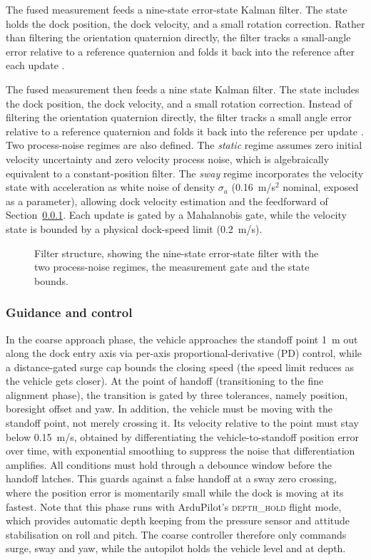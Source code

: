 The fused measurement feeds a nine-state error-state Kalman filter. The state holds the dock position, the dock velocity, and a small rotation correction. Rather than filtering the orientation quaternion directly, the filter tracks a small-angle error relative to a reference quaternion and folds it back into the reference after each update \cite{sola2017quaternion}.

The fused measurement then feeds a nine state Kalman filter. The state includes the dock position, the dock velocity, and a small rotation correction. Instead of filtering the orientation quaternion directly, the filter tracks a small angle error relative to a reference quaternion and folds it back into the reference per update \cite{sola2017quaternion}. Two process-noise regimes are also defined. The \emph{static} regime assumes zero initial velocity uncertainty and zero velocity process noise, which is algebraically equivalent to a constant-position filter. The \emph{sway} regime incorporates the velocity state with acceleration as white noise of density $\sigma_a$ (0.16~m/s$^2$ nominal, exposed as a parameter), allowing dock velocity estimation and the feedforward of Section~\ref{sec:method-control}. Each update is gated by a Mahalanobis gate, while the velocity state is bounded by a physical dock-speed limit (0.2~m/s).

\begin{figure}[H]
    \centering
    
    \caption{Filter structure, showing the nine-state error-state filter with the two
        process-noise regimes, the measurement gate and the state bounds.}
    \label{fig:kf}
\end{figure}

\subsubsection{Guidance and control}
\label{sec:method-control}

In the coarse approach phase, the vehicle approaches the standoff point 1~m out along the dock entry axis via per-axis proportional-derivative (PD) control, while a distance-gated surge cap bounds the closing speed (the speed limit reduces as the vehicle gets closer). At the point of handoff (transitioning to the fine alignment phase), the transition is gated by three tolerances, namely position, boresight offset and yaw. In addition, the vehicle must be moving with the standoff point, not merely crossing it. Its velocity relative to the point must stay below 0.15~m/s, obtained by differentiating the vehicle-to-standoff position error over time, with exponential smoothing to suppress the noise that differentiation amplifies. All conditions must hold through a debounce window before the handoff latches. This guards against a false handoff at a sway zero crossing, where the position error is momentarily small while the dock is moving at its fastest. Note that this phase runs with ArduPilot's \textsc{depth\_hold} flight mode, which provides automatic depth keeping from the pressure sensor and attitude stabilisation on roll and pitch. The coarse controller therefore only commands surge, sway and yaw, while the autopilot holds the vehicle level and at depth.

